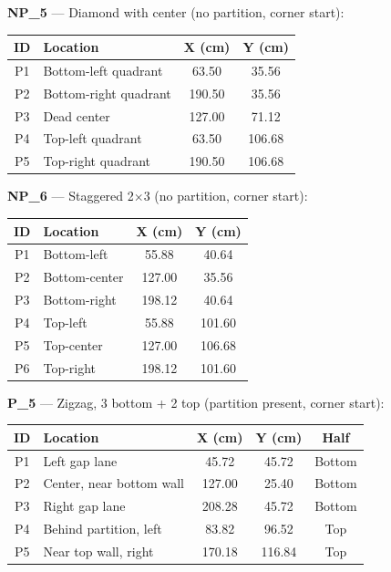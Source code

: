 \documentclass[a4]{article}
\begin{document}
\textbf{NP\_5} --- Diamond with center (no partition, corner start):

\begin{table}[H]
\centering
\begin{tabular}{clcc}
\toprule
\textbf{ID} & \textbf{Location} & \textbf{X (cm)} & \textbf{Y (cm)} \\
\midrule
P1 & Bottom-left quadrant & 63.50 & 35.56 \\
P2 & Bottom-right quadrant & 190.50 & 35.56 \\
P3 & Dead center & 127.00 & 71.12 \\
P4 & Top-left quadrant & 63.50 & 106.68 \\
P5 & Top-right quadrant & 190.50 & 106.68 \\
\bottomrule
\end{tabular}
\end{table}

\textbf{NP\_6} --- Staggered 2$\times$3 (no partition, corner start):

\begin{table}[H]
\centering
\begin{tabular}{clcc}
\toprule
\textbf{ID} & \textbf{Location} & \textbf{X (cm)} & \textbf{Y (cm)} \\
\midrule
P1 & Bottom-left & 55.88 & 40.64 \\
P2 & Bottom-center & 127.00 & 35.56 \\
P3 & Bottom-right & 198.12 & 40.64 \\
P4 & Top-left & 55.88 & 101.60 \\
P5 & Top-center & 127.00 & 106.68 \\
P6 & Top-right & 198.12 & 101.60 \\
\bottomrule
\end{tabular}
\end{table}

\textbf{P\_5} --- Zigzag, 3 bottom + 2 top (partition present, corner start):

\begin{table}[H]
\centering
\begin{tabular}{clccc}
\toprule
\textbf{ID} & \textbf{Location} & \textbf{X (cm)} & \textbf{Y (cm)} & \textbf{Half} \\
\midrule
P1 & Left gap lane & 45.72 & 45.72 & Bottom \\
P2 & Center, near bottom wall & 127.00 & 25.40 & Bottom \\
P3 & Right gap lane & 208.28 & 45.72 & Bottom \\
P4 & Behind partition, left & 83.82 & 96.52 & Top \\
P5 & Near top wall, right & 170.18 & 116.84 & Top \\
\bottomrule
\end{tabular}
\end{table}
\end{document}
